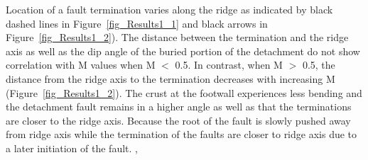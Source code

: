 Location of a fault termination varies along the ridge as indicated by black dashed lines in Figure~\hyperref[fig_Results1_1]{\ref{fig_Results1_1}} and black arrows in Figure~\hyperref[fig_Results1_2]{\ref{fig_Results1_2}}).
The distance between the termination and the ridge axis as well as the dip angle of the buried portion of the detachment do not show correlation with M values when M $<$ 0.5. %
In contrast, when M $>$ 0.5, the distance from the ridge axis to the termination decreases with increasing M (Figure~\hyperref[fig_Results1_2]{\ref{fig_Results1_2}}). The crust at the footwall experiences less bending and the detachment fault remains in a higher angle as well as that the terminations are closer to the ridge axis. Because the root of the fault is slowly pushed away from ridge axis while the termination of the faults are closer to ridge axis due to a later initiation of the fault. ,  %
